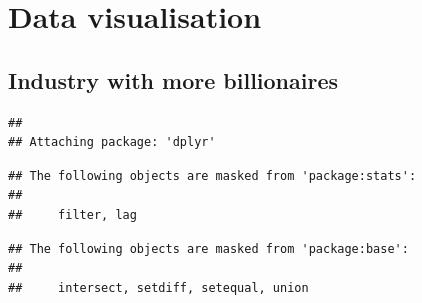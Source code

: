 \documentclass[11pt,preprint]{elsarticle}
\numberwithin{equation}{section}
\numberwithin{figure}{section}
\numberwithin{table}{section}
\begin{document}
\section{Data visualisation}\label{data-visualisation}

\subsection{Industry with more
billionaires}\label{industry-with-more-billionaires}

\begin{Shaded}
\begin{Highlighting}[]
\end{Highlighting}
\end{Shaded}

\begin{verbatim}
## 
## Attaching package: 'dplyr'
\end{verbatim}

\begin{verbatim}
## The following objects are masked from 'package:stats':
## 
##     filter, lag
\end{verbatim}

\begin{verbatim}
## The following objects are masked from 'package:base':
## 
##     intersect, setdiff, setequal, union
\end{verbatim}

\begin{Shaded}
\begin{Highlighting}[]
\OtherTok{\textless{}{-}}\SpecialCharTok{\%\textgreater{}\%}
   \NormalTok{) }\SpecialCharTok{\%\textgreater{}\%}
  \NormalTok{(}

\NormalTok{(} \SpecialCharTok{+}
  \NormalTok{(} \NormalTok{, } \NormalTok{) }\SpecialCharTok{+}
  \NormalTok{() }\SpecialCharTok{+}  
  \NormalTok{(}
     \NormalTok{,}
     \NormalTok{,}
     
\NormalTok{  ) }\SpecialCharTok{+}
  \NormalTok{()}
\end{Highlighting}
\end{Shaded}
\end{document}

